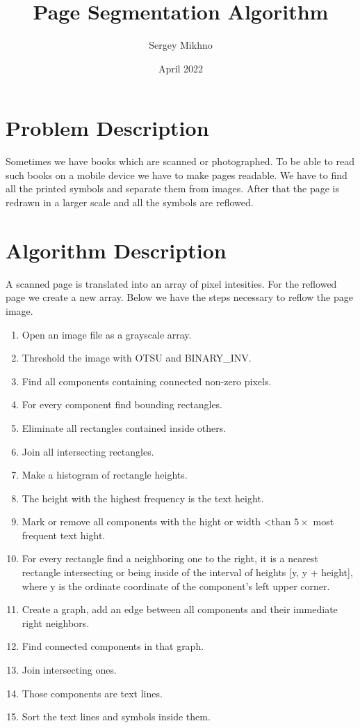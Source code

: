 \documentclass{article}
\title{Page Segmentation Algorithm}
\author{Sergey Mikhno}
\date{April 2022}
\begin{document}
\maketitle

\begin{multicols}{2}
\section{Problem Description}
Sometimes we have books which are scanned or photographed. To be able to read such books on a mobile device we have to make pages readable. We have to find all the printed symbols and separate them from images. After that the page is redrawn in a larger scale and all the symbols are reflowed.

\section{Algorithm Description}

A scanned page is translated into an array of pixel intesities. For the reflowed page we create a new array. Below we have the steps necessary to reflow the page image.

\begin{enumerate}
\item Open an image file as a grayscale array.
\item Threshold the image with OTSU and BINARY\_INV.
\item Find all components containing connected non-zero pixels.
\item For every component find bounding rectangles.
\item Eliminate all rectangles contained inside others.
\item Join all intersecting rectangles.
\item Make a histogram of rectangle heights.
\item The height with the highest frequency is the text height.
\item Mark or remove all components with the hight or width \textless than $ 5 \times $ most frequent text hight.
\item For every rectangle find a neighboring one to the right, it is a nearest rectangle  intersecting or being inside of the interval of heights [y, y + height], where y is the ordinate coordinate of the component's left upper corner.
\item Create a graph, add an edge between all components and their immediate right neighbors.
\item Find connected components in that graph.
\item Join intersecting ones.
\item Those components are text lines.
\item Sort the text lines and symbols inside them.
\end{enumerate}

\end{multicols}
	

	
\end{document}
